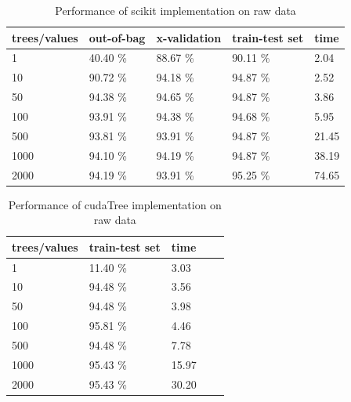 \documentclass[thesis=B,english]{FITthesis}[2012/10/20]
\begin{document}
\begin{table}[h]
\begin{tabular}{|l|l|l|l|l|}
\hline
trees/values & out-of-bag & x-validation & train-test set & time \\ \hline
1            &40.40 \%           &88.67 \%              &90.11 \%                & 2.04          \\ \hline
10           &90.72 \%           &94.18 \%              &94.87 \%                &2.52           \\ \hline
50           &94.38 \%           &94.65 \%              &94.87 \%                &3.86        \\ \hline
100          &93.91 \%           &94.38 \%              &94.68 \%                &5.95        \\ \hline
500          &93.81 \%           &93.91 \%              &94.87 \%                &21.45      \\ \hline
1000         &94.10 \%           &94.19 \%              &94.87 \%                &38.19         \\ \hline
2000         &94.19 \%           &93.91 \%              &95.25 \%                &74.65        \\ \hline
\end{tabular}
\caption{Performance of scikit implementation on raw data}
\label{tab:scikit-raw}
\end{table}
\begin{table}[h]
\begin{tabular}{|l|l|l|l|l|}
\hline
trees/values & train-test set & time \\ \hline
1            & 11.40 \%              & 3.03      \\ \hline
10           & 94.48 \%              & 3.56      \\ \hline
50           & 94.48 \%              & 3.98      \\ \hline
100          & 95.81 \%              & 4.46      \\ \hline
500          & 94.48 \%              & 7.78     \\ \hline
1000         & 95.43 \%              & 15.97     \\ \hline
2000         & 95.43 \%              & 30.20     \\ \hline
\end{tabular}
\caption{Performance of cudaTree implementation on raw data}
\label{tab:cuda-raw}
\end{table}
\end{document}
